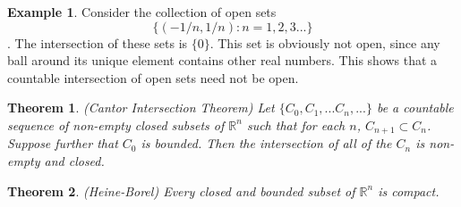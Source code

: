 \documentclass[11pt,a4paper]{report}
\theoremstyle{plain}
\newtheorem{thm}{Theorem}[section]
\theoremstyle{definition}
\newtheorem{exmp}{Example}[section]
\theoremstyle{remark}
\begin{document}
\begin{exmp}
Consider the collection of open sets $$\{(-1/n,1/n) : n = 1,2, 3...\}$$.  The intersection of these sets is $\{0\}$.  This set is obviously not open, since any ball around its unique element contains other real numbers. This shows that a countable intersection of open sets need not be open.
\end{exmp}
\begin{thm}{(Cantor Intersection Theorem)}
Let $\{C_0, C_1, ... C_n, ...\}$ be a countable sequence of non-empty closed subsets of $\mathbb{R}^n$ such that for each $n$, $C_{n+1} \subset C_n$.  Suppose further that $C_0$ is bounded. Then the intersection of all of the $C_n$ is non-empty and closed.
\end{thm}
\begin{thm}{(Heine-Borel)}
Every closed and bounded subset of $\mathbb{R}^n$ is compact.
\end{thm}
\end{document}
